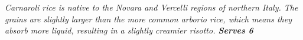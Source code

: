 \documentclass[a4paper]{article}
\begin{document}
\noindent\begin{minipage}[t]{0.1\textwidth} %
        \vspace{0pt}
\end{minipage}\hfill
\begin{minipage}[t][0.9\textheight]{0.8\textwidth}
        \vspace{0pt}
        \noindent\textit{\textcolor{emphasis}{
                        Carnaroli rice is native to the Novara and Vercelli
                        regions of northern Italy.  The grains are slightly
                        larger than the more common arborio rice, which means
                        they absorb more liquid, resulting in a slightly
                        creamier risotto.
                        \textbf{Serves 6}
        }}


\end{minipage}
\end{document}
